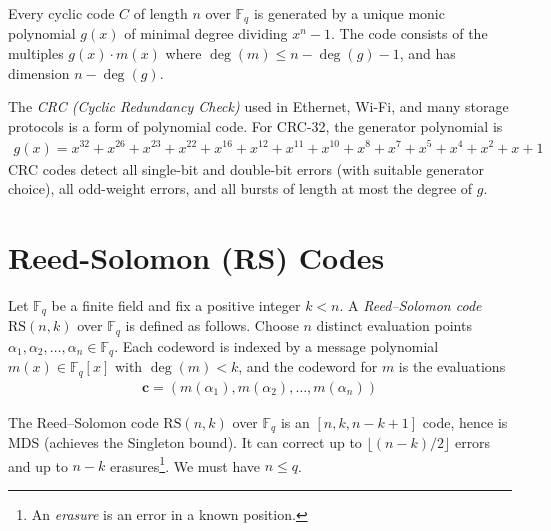 \documentclass[a4paper, 12pt]{book} %
\begin{document}
\begin{proposition}
    Every cyclic code $C$ of length $n$ over $\mathbb{F}_q$ is generated by a unique monic polynomial $g(x)$ of minimal degree dividing $x^n - 1$. The code consists of the multiples $g(x) \cdot m(x)$ where $\deg(m) \leq n - \deg(g) - 1$, and has dimension $n - \deg(g)$.
\end{proposition}

\begin{example}
    The \emph{CRC (Cyclic Redundancy Check)} used in Ethernet, Wi-Fi, and many storage protocols is a form of polynomial code. For CRC-32, the generator polynomial is
    \begin{align}
        g(x) = x^{32} + x^{26} + x^{23} + x^{22} + x^{16} + x^{12} + x^{11} + x^{10} + x^8 + x^7 + x^5 + x^4 + x^2 + x + 1
    \end{align}
    CRC codes detect all single-bit and double-bit errors (with suitable generator choice), all odd-weight errors, and all bursts of length at most the degree of $g$.
\end{example}

\section{Reed-Solomon (RS) Codes}

\begin{definition}
    Let $\mathbb{F}_q$ be a finite field and fix a positive integer $k < n$. A \emph{Reed--Solomon code} $\mathrm{RS}(n, k)$ over $\mathbb{F}_q$ is defined as follows. Choose $n$ distinct evaluation points $\alpha_1, \alpha_2, \ldots, \alpha_n \in \mathbb{F}_q$. Each codeword is indexed by a message polynomial $m(x) \in \mathbb{F}_q[x]$ with $\deg(m) < k$, and the codeword for $m$ is the evaluations
    \begin{align}
        \mathbf{c} = (m(\alpha_1), m(\alpha_2), \ldots, m(\alpha_n))
    \end{align}
\end{definition}

\begin{theorem}
    The Reed--Solomon code $\mathrm{RS}(n, k)$ over $\mathbb{F}_q$ is an $[n, k, n - k + 1]$ code, hence is MDS (achieves the Singleton bound). It can correct up to $\lfloor (n-k)/2 \rfloor$ errors and up to $n - k$ erasures\footnote{An \emph{erasure} is an error in a known position.}. We must have $n \leq q$.
\end{theorem}
\end{document}
